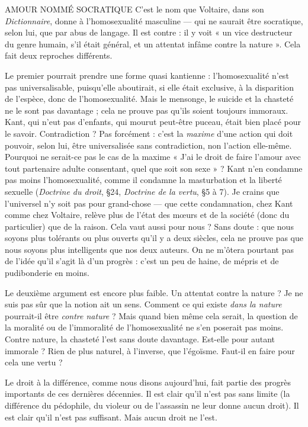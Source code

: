 AMOUR NOMMÉ SOCRATIQUE C’est le nom que Voltaire, dans son {\it Dictionnaire},
donne à l'homosexualité masculine —
qui ne saurait être socratique, selon lui, que par abus de langage. Il est
contre : il y voit « un vice destructeur du genre humain, s’il était général, et un
attentat infâme contre la nature ». Cela fait deux reproches différents.

Le premier pourrait prendre une forme quasi kantienne : l'homosexualité
n’est pas universalisable, puisqu'elle aboutirait, si elle était exclusive, à la disparition
de l'espèce, donc de l'homosexualité. Mais le mensonge, le suicide et la
chasteté ne le sont pas davantage ; cela ne prouve pas qu’ils soient toujours
immoraux. Kant, qui n’eut pas d’enfants, qui mourut peut-être puceau, était
bien placé pour le savoir. Contradiction ? Pas forcément : c’est la {\it maxime} d’une
action qui doit pouvoir, selon lui, être universalisée sans contradiction, non
l’action elle-même. Pourquoi ne serait-ce pas le cas de la maxime « J'ai le droit
de faire l'amour avec tout partenaire adulte consentant, quel que soit son
sexe » ? Kant n’en condamne pas moins l'homosexualité, comme il condamne
la masturbation et la liberté sexuelle ({\it Doctrine du droit}, \S 24, {\it Doctrine de la
vertu}, \S 5 à 7). Je crains que l’universel n’y soit pas pour grand-chose — que
cette condamnation, chez Kant comme chez Voltaire, relève plus de l’état des
mœurs et de la société (donc du particulier) que de la raison. Cela vaut aussi
pour nous ? Sans doute : que nous soyons plus tolérants ou plus ouverts qu’il y
a deux siècles, cela ne prouve pas que nous soyons plus intelligents que nos
deux auteurs. On ne m’ôtera pourtant pas de l’idée qu’il s’agit là d’un progrès :
c’est un peu de haine, de mépris et de pudibonderie en moins.

Le deuxième argument est encore plus faible. Un attentat contre la nature ?
Je ne suis pas sûr que la notion ait un sens. Comment ce qui existe {\it dans la
nature} pourrait-il être {\it contre nature} ? Mais quand bien même cela serait, la
question de la moralité ou de l’immoralité de l’homosexualité ne s’en poserait
pas moins. Contre nature, la chasteté l’est sans doute davantage. Est-elle pour
autant immorale ? Rien de plus naturel, à l'inverse, que l’égoïsme. Faut-il en
faire pour cela une vertu ?

Le droit à la différence, comme nous disons aujourd’hui, fait partie des progrès
importants de ces dernières décennies. Il est clair qu’il n’est pas sans limite
(la différence du pédophile, du violeur ou de l’assassin ne leur donne aucun
droit). Il est clair qu’il n’est pas suffisant. Mais aucun droit ne l’est.

